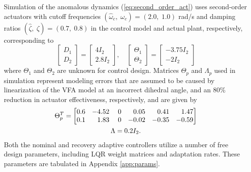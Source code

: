 Simulation of the anomalous dynamics (\ref{eq:second_order_act}) uses second-order actuators with cutoff frequencies $(\hat{\omega}_c,\; \omega_c) = (2.0 ,\; 1.0)$ rad/s and damping ratios $(\hat{\zeta},\; \zeta) = (0.7,\; 0.8)$ in the control model and actual plant, respectively, corresponding to
\begin{equation}
\begin{bmatrix}
	D_1 \\ D_2
\end{bmatrix} = \begin{bmatrix}
	4 I_2 \\ 2.8 I_2
\end{bmatrix}, \quad \begin{bmatrix}
	\Theta_1 \\ \Theta_2 
\end{bmatrix} = \begin{bmatrix}
	-3.75 I_2 \\ -2 I_2
\end{bmatrix}
\end{equation}
where $\Theta_1$ and $\Theta_2$ are unknown for control design. Matrices $\Theta_p$ and $\Lambda_p$ used in simulation represent modeling errors that are assumed to be caused by linearization of the VFA model at an incorrect dihedral angle, and an 80\% reduction in actuator effectiveness, respectively, and are given by
\begin{equation}
\begin{gathered}
\Theta_{p}^{T}=\begin{bmatrix}
0.6 & -4.52 & \; 0 & \hfill 0.05 & \hfill 0.41 & \hfill 1.47\\
0.1 & \hfill 1.83 & \; 0 & -0.02 & -0.35 & -0.59
\end{bmatrix}\\ \Lambda = 0.2 I_2. \end{gathered} \label{eq:theta_p}
\end{equation}
Both the nominal and recovery adaptive controllers utilize a number of free design parameters, including LQR weight matrices and adaptation rates. These parameters are tabulated in Appendix \ref{app:params}.


